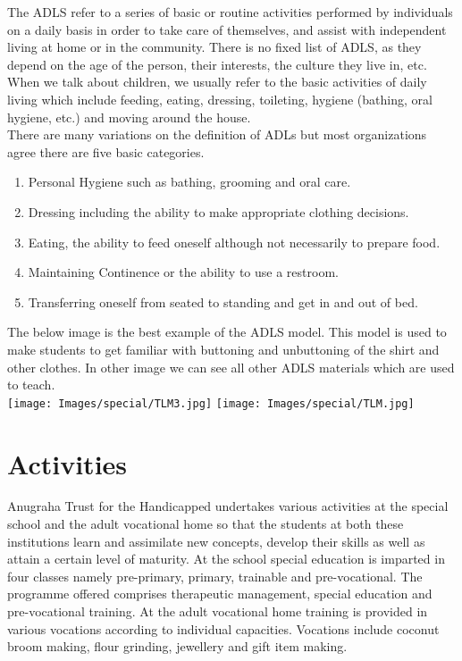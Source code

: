 The ADLS refer to a series of basic or routine activities performed by individuals on a daily basis in order to take care of themselves, and assist with independent living at home or in the community. There is no fixed list of ADLS, as they depend on the age of the person, their interests, the culture they live in, etc. When we talk about children, we usually refer to the basic activities of daily living which include feeding, eating, dressing, toileting, hygiene (bathing, oral hygiene, etc.) and moving around the house. \\

There are many variations on the definition of ADLs but most organizations agree there are five basic categories.  
\begin{enumerate}
    \item Personal Hygiene such as bathing, grooming and oral care.
    \item Dressing including the ability to make appropriate clothing decisions.
    \item Eating, the ability to feed oneself although not necessarily to prepare food.
    \item Maintaining Continence or the ability to use a restroom.
    \item Transferring oneself from seated to standing and get in and out of bed.
\end{enumerate}

The below image is the best example of the ADLS model. This model is used to make students to get familiar with buttoning and unbuttoning of the shirt and other clothes. In other image we can see all other ADLS materials which are used to teach.\\

\texttt{[image: Images/special/TLM3.jpg]} \hfill
\texttt{[image: Images/special/TLM.jpg]}

\section{Activities}
Anugraha Trust for the Handicapped undertakes various activities at the special school and the adult vocational home so that the students at both these institutions learn and assimilate new concepts, develop their skills as well as attain a certain level of maturity. At the school special education is imparted in four classes namely pre-primary, primary, trainable and pre-vocational.  The programme offered comprises therapeutic management, special education and pre-vocational training. At the adult vocational home training is provided in various vocations according to individual capacities. Vocations include coconut broom making, flour grinding, jewellery and gift item making.\\

